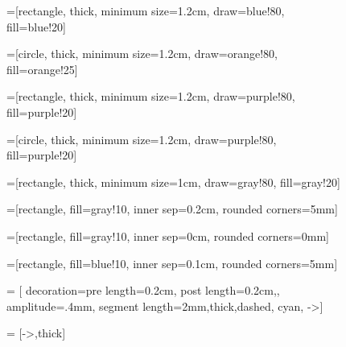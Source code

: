 \documentclass[a4paper,10pt]{article}
\begin{document}
	\thispagestyle{empty}
	\begin{figure}[htbp]
		\centering
		=[rectangle,
		thick,
		minimum size=1.2cm,
		draw=blue!80,
		fill=blue!20]
		
		=[circle,
		thick,
		minimum size=1.2cm,
		draw=orange!80,
		fill=orange!25]
		
		=[rectangle,
		thick,
		minimum size=1.2cm,
		draw=purple!80,
		fill=purple!20]
		
		=[circle,
		thick,
		minimum size=1.2cm,
		draw=purple!80,
		fill=purple!20]
		
		=[rectangle,
		thick,
		minimum size=1cm,
		draw=gray!80,
		fill=gray!20]
		
		
		=[rectangle,
		fill=gray!10,
		inner sep=0.2cm,
		rounded corners=5mm]
		
		=[rectangle,
		fill=gray!10,
		inner sep=0cm,
		rounded corners=0mm]
		
		=[rectangle,
		fill=blue!10,
		inner sep=0.1cm,
		rounded corners=5mm]
		
		 = [ decoration={pre length=0.2cm,
			post length=0.2cm,, amplitude=.4mm,
			segment length=2mm},thick,dashed, cyan, ->]
		
		 = [->,thick]
		
		\begin{tikzpicture}[>=latex,text height=1.5ex,text depth=0.25ex]
		

\end{tikzpicture}
\end{figure}
\end{document}

